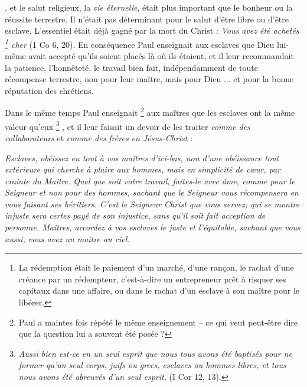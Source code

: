 , et le salut religieux, la \emph{vie éternelle}, était plus important que le bonheur ou la réussite terrestre. Il n'était pas déterminant pour le salut d'être libre ou d'être esclave. L'essentiel était déjà gagné par la mort du Christ : \emph{Vous avez été achetés%
\footnote{La rédemption était le paiement d'un marché, d'une rançon, le rachat d'une créance par un rédempteur, c'est-à-dire un entrepreneur prêt à risquer ses capitaux dans une affaire, ou dans le rachat d'un esclave à son maître pour le libérer.} 
cher} (1 Co 6, 20). En conséquence Paul enseignait aux esclaves que Dieu lui-même avait accepté qu'ils soient placés là où ils étaient, et il leur recommandait la patience, l'honnêteté, le travail bien fait, indépendamment de toute récompense terrestre, non pour leur maître, mais pour Dieu ... et pour la bonne réputation des chrétiens. 

 Dans le même temps Paul enseignait%
\footnote{Paul a maintes fois répété le même enseignement -- ce qui veut peut-être dire que la question lui a souvent été posée ?} 
aux maîtres que les esclaves ont la même valeur qu'eux%
\footnote{\emph{Aussi bien est-ce en un seul esprit que nous tous avons été baptisés pour ne former qu'un seul corps, juifs ou grecs, esclaves ou hommes libres, et tous nous avons été abreuvés d'un seul esprit.} (I Cor 12, 13).}%
, et il leur faisait un devoir de les traiter \emph{comme des collaborateurs} et \emph{comme des frères en Jésus-Christ} :

\begin{displayquote}[Col 3, 22-25 ; 4,1]
\emph{Esclaves, obéissez en tout à vos maîtres d'ici-bas, non d'une obéissance tout extérieure qui cherche à plaire aux hommes, mais en simplicité de cœur, par crainte du Maître. Quel que soit votre travail, faites-le avec âme, comme pour le Seigneur et non pour des hommes, sachant que le Seigneur vous récompensera en vous faisant ses héritiers. C'est le Seigneur Christ que vous servez; qui se montre injuste sera certes payé de son injustice, sans qu'il soit fait acception de personne. Maîtres, accordez à vos esclaves le juste et l'équitable, sachant que vous aussi, vous avez un maître au ciel.}
\end{displayquote}

